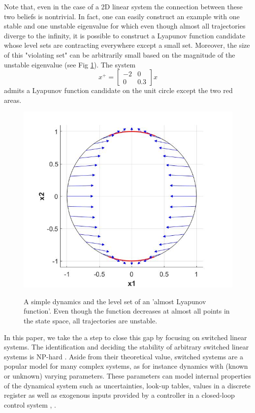 Note that, even in the case of a 2D linear system the connection between these two beliefs is nontrivial. In fact, one can easily construct an example with one stable and one unstable eigenvalue for which even though almost all trajectories diverge to the infinity, it is possible to construct a Lyapunov function candidate whose level sets are contracting everywhere except a small set. 
Moreover, the size of this "violating set" can be arbitrarily small based on the magnitude of the unstable eigenvalue (see Fig \ref{fig:levelset}). 
The system
\[
x^+ = \begin{bmatrix}
-2 & 0\\
0 & 0.3
\end{bmatrix}x
\]
admits a Lyapunov function candidate on the unit circle except the two red areas.
\begin{figure}
\includegraphics[scale=0.35]{ex1.jpg}
\label{fig:levelset}
\caption{A simple dynamics and the level set of an 'almost Lyapunov function'. Even though the function decreases at almost all points in the state space, all trajectories are unstable.}
\end{figure}


In this paper, we take the a step to close this gap by focusing on switched linear systems. The identification and deciding the stability of arbitrary switched linear systems is NP-hard \cite{jungersBook}. Aside from their theoretical value, switched systems are a popular model for many complex systems, as for instance dynamics with (known or unknown) varying parameters. These parameters can model internal properties of the dynamical system such as uncertainties, look-up tables, values in a discrete register as well as exogenous inputs provided by a controller in a closed-loop control system \cite{liberzon-switching}, \cite{sun-ge}.

